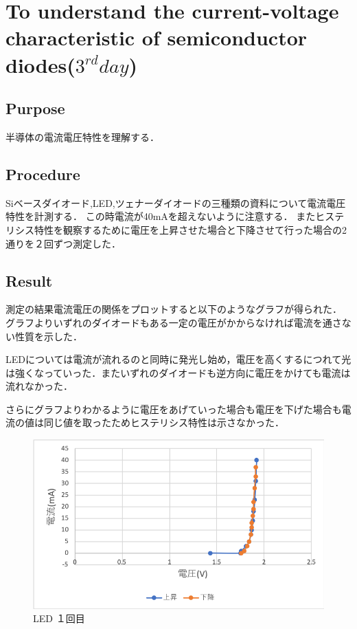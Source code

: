 \documentclass[11pt, a4paper,twocolumn]{jarticle}
\begin{document}
\section{To understand the current-voltage characteristic of semiconductor diodes($3^{rd} day$)}

\subsection{Purpose}
半導体の電流電圧特性を理解する．
\subsection{Procedure}
Siベースダイオード,LED,ツェナーダイオードの三種類の資料について電流電圧特性を計測する．
この時電流が40mAを超えないように注意する．
またヒステリシス特性を観察するために電圧を上昇させた場合と下降させて行った場合の2通りを２回ずつ測定した．

\subsection{Result}
測定の結果電流電圧の関係をプロットすると以下のようなグラフが得られた．
グラフよりいずれのダイオードもある一定の電圧がかからなければ電流を通さない性質を示した．

LEDについては電流が流れるのと同時に発光し始め，電圧を高くするにつれて光は強くなっていった．またいずれのダイオードも逆方向に電圧をかけても電流は流れなかった．

さらにグラフよりわかるように電圧をあげていった場合も電圧を下げた場合も電流の値は同じ値を取ったためヒステリシス特性は示さなかった．

\begin{figure}[htbp]
 \begin{center}
  \includegraphics[width=0.8\linewidth]{fig23.png}
 \end{center}
 \caption{LED １回目}
 \label{fig:23}
\end{figure}
\end{document}
